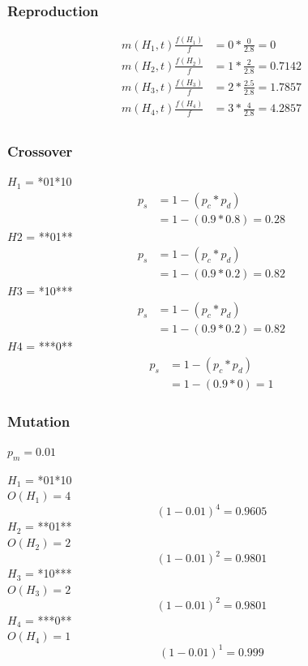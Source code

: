 \documentclass{article}
\begin{document}
\subsubsection*{Reproduction}
\begin{align*}
    m(H_1,t) \frac{f(H_1)}{f}&= 0 *\frac{0}{2.8} = 0\\
    m(H_2,t) \frac{f(H_2)}{f}&= 1 *\frac{2}{2.8} = 0.7142\\
    m(H_3,t) \frac{f(H_3)}{f}&= 2 *\frac{2.5}{2.8} = 1.7857\\
    m(H_4,t) \frac{f(H_4)}{f}&= 3 *\frac{4}{2.8} = 4.2857\\
\end{align*}

\subsubsection*{Crossover}
\begin{multicols}{2}
    $H_1$ = *01*10
    \begin{align*}
        p_s &= 1 - (p_c * p_d)\\
        &= 1 - (0.9 * 0.8) = 0.28
    \end{align*}
    $H2$ = **01**
    \begin{align*}
        p_s &= 1 - (p_c * p_d)\\
        &= 1 - (0.9 * 0.2) = 0.82
    \end{align*}
    $H3$ = *10***
    \begin{align*}
        p_s &= 1 - (p_c * p_d)\\
        &= 1 - (0.9 * 0.2) = 0.82
    \end{align*}
    $H4$ = ***0**
    \begin{align*}
        p_s &= 1 - (p_c * p_d)\\
        &= 1 - (0.9 * 0) = 1
    \end{align*}
\end{multicols}

\subsubsection*{Mutation}
$p_m = 0.01$
\begin{multicols}{2}
    $H_1$ = *01*10\\
    $O(H_1) = 4$
    \begin{equation*}
        (1-0.01)^4 = 0.9605
    \end{equation*}
    $H_2$ = **01**\\
    $O(H_2) = 2$
    \begin{equation*}
        (1-0.01)^2 = 0.9801
    \end{equation*}
    $H_3$ = *10***\\
    $O(H_3) = 2$
    \begin{equation*}
        (1-0.01)^2 = 0.9801
    \end{equation*}
    $H_4$ = ***0**\\
    $O(H_4) = 1$
    \begin{equation*}
        (1-0.01)^1 = 0.999
    \end{equation*}
\end{multicols}
\end{document}
